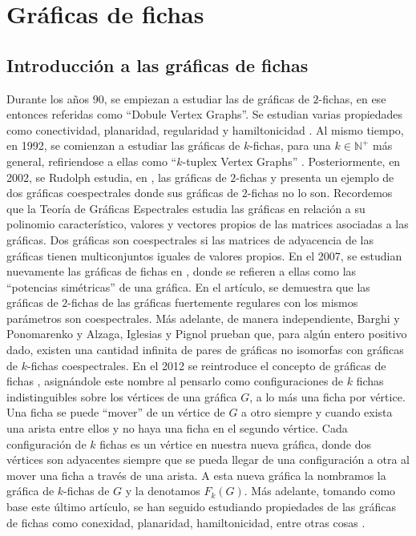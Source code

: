 \chapter{Gr\'aficas de fichas}%
\label{cap:fichass}

\section{Introducci\'on a las gr\'aficas de fichas}%
\label{sec:intro-fichas}


Durante los a\~{n}os 90, se empiezan a estudiar las de gr\'aficas de $2$-fichas,
en ese entonces referidas como ``Dobule Vertex Graphs''. Se estudian
varias propiedades como conectividad, planaridad, regularidad y hamiltonicidad
\cite{alaviPlanarity, alaviDVGraphs, alaviHamilt, zhuConnect}. Al mismo tiempo,
en 1992, se comienzan a estudiar las gr\'aficas de $k$-fichas, para una $k \in
\mathbb{N^{+}}$ m\'as general, refiriendose a ellas como ``$k$-tuplex Vertex
Graphs'' \cite{zhuNTuples}. Posteriormente, en 2002, se Rudolph estudia, en
\cite{rudolphGInv}, las gr\'aficas de $2$-fichas y presenta un ejemplo de dos
gr\'aficas coespectrales donde sus gr\'aficas de $2$-fichas no lo son.
Recordemos que la Teor\'ia de Gr\'aficas Espectrales estudia las gr\'aficas en
relaci\'on a su polinomio caracter\'istico, valores y vectores propios de las
matrices asociadas a las gr\'aficas. Dos gr\'aficas son coespectrales si las
matrices de adyacencia de las gr\'aficas tienen multiconjuntos iguales de
valores propios. En el 2007, se estudian nuevamente las gr\'aficas de fichas en
\cite{audeanetSymPower}, donde se refieren a ellas como las ``potencias
sim\'etricas'' de una gr\'afica. En el art\'iculo, se demuestra que las
gr\'aficas de $2$-fichas de las gr\'aficas fuertemente regulares con los mismos
par\'ametros son coespectrales. M\'as adelante, de manera independiente, Barghi
y Ponomarenko \cite{barghi-ponomarenko} y Alzaga, Iglesias y Pignol
\cite{alzagaSymPower} prueban que, para alg\'un entero positivo dado, existen
una cantidad infinita de pares de gr\'aficas no isomorfas con gr\'aficas de
$k$-fichas coespectrales. En el 2012 se reintroduce el concepto de gr\'aficas de
fichas \cite{fabilaToken}, asign\'andole este nombre al pensarlo como
configuraciones de $k$ fichas indistinguibles sobre los v\'ertices de una
gr\'afica $G$, a lo m\'as una ficha por v\'ertice. Una ficha se puede ``mover''
de un v\'ertice de $G$ a otro siempre y cuando exista una arista entre ellos y
no haya una ficha en el segundo v\'ertice. Cada configuraci\'on de $k$ fichas
es un v\'ertice en nuestra nueva gr\'afica, donde dos v\'ertices son
adyacentes siempre que se pueda llegar de una configuraci\'on a otra al mover
una ficha a trav\'es de una arista. A esta nueva gr\'afica la nombramos la
gr\'afica de $k$-fichas de $G$ y la denotamos $F_k(G)$. M\'as adelante, tomando
como base este \'ultimo art\'iculo, se han seguido estudiando propiedades de las
gr\'aficas de fichas como conexidad, planaridad, hamiltonicidad, entre otras
cosas \cite{carballosaRegPlan, leaConnect, riveraHamilt, adameHamilt,
leaEConnect}.

